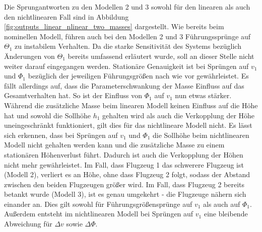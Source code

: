 Die Sprungantworten zu den Modellen 2 und 3 sowohl für den linearen als auch den nichtlinearen Fall sind in Abbildung \ref{fig:outputs_linear_nlinear_two_masses} dargestellt.
Wie bereits beim nominellen Modell, führen auch bei den Modellen 2 und 3 Führungssprünge auf $\Theta_1$ zu instabilem Verhalten. Da die starke Sensitivität des Systems bezüglich Änderungen von $\Theta_1$ bereits umfassend erläutert wurde, soll an dieser Stelle nicht weiter darauf eingegangen werden. Stationäre Genauigkeit ist bei Sprüngen auf $v_1$ und $\Phi_1$ bezüglich der jeweiligen Führungsgrößen nach wie vor gewährleistet. Es fällt allerdings auf, dass die Parameterschwankung der Masse Einfluss auf das Gesamtverhalten hat. So ist der Einfluss von $\Phi_1$ auf $v_1$ nun etwas stärker. Während die zusätzliche Masse beim linearen Modell keinen Einfluss auf die Höhe hat und sowohl die Sollhöhe $h_1$ gehalten wird als auch die Verkopplung der Höhe uneingeschränkt funktioniert, gilt dies für das nichtlineare Modell nicht. Es lässt sich erkennen, dass bei Sprüngen auf $v_1$ und $\Phi_1$ die Sollhöhe beim nichtlinearen Modell nicht gehalten werden kann und die zusätzliche Masse zu einem stationären Höhenverlust führt. Dadurch ist auch die Verkopplung der Höhen nicht mehr gewährleistet. Im Fall, dass Flugzeug 1 das schwerere Flugzeug ist (Modell 2), verliert es an Höhe, ohne dass Flugzeug 2 folgt, sodass der Abstand zwischen den beiden Flugzeugen größer wird. Im Fall, dass Flugzeug 2 bereits betankt wurde (Modell 3), ist es genau umgekehrt - die Flugzeuge nähern sich einander an. Dies gilt sowohl für Führungsgrößensprünge auf $v_1$ als auch auf $\Phi_1$. Außerdem entsteht im nichtlinearen Modell bei Sprüngen auf $v_1$ eine bleibende Abweichung für $\Delta v$ sowie $\Delta \Phi$. 

